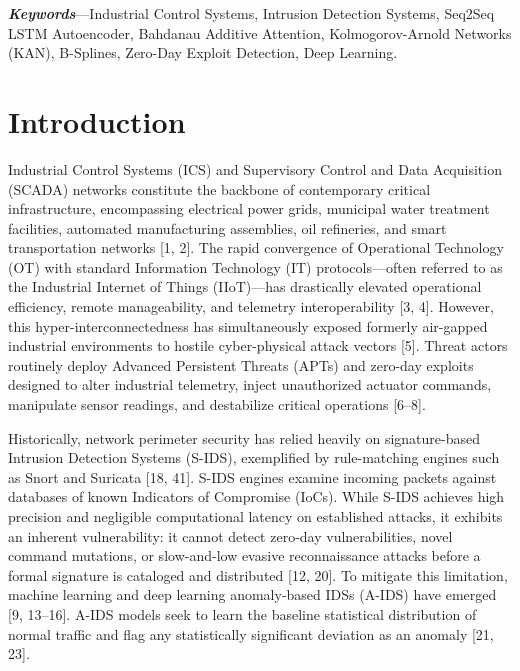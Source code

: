 \documentclass[twocolumn]{article}
\begin{document}
\textbf{\textit{Keywords}}---Industrial Control Systems, Intrusion Detection Systems, Seq2Seq LSTM Autoencoder, Bahdanau Additive Attention, Kolmogorov-Arnold Networks (KAN), B-Splines, Zero-Day Exploit Detection, Deep Learning.

\section{Introduction}
Industrial Control Systems (ICS) and Supervisory Control and Data Acquisition (SCADA) networks constitute the backbone of contemporary critical infrastructure, encompassing electrical power grids, municipal water treatment facilities, automated manufacturing assemblies, oil refineries, and smart transportation networks [1, 2]. The rapid convergence of Operational Technology (OT) with standard Information Technology (IT) protocols---often referred to as the Industrial Internet of Things (IIoT)---has drastically elevated operational efficiency, remote manageability, and telemetry interoperability [3, 4]. However, this hyper-interconnectedness has simultaneously exposed formerly air-gapped industrial environments to hostile cyber-physical attack vectors [5]. Threat actors routinely deploy Advanced Persistent Threats (APTs) and zero-day exploits designed to alter industrial telemetry, inject unauthorized actuator commands, manipulate sensor readings, and destabilize critical operations [6--8].

Historically, network perimeter security has relied heavily on signature-based Intrusion Detection Systems (S-IDS), exemplified by rule-matching engines such as Snort and Suricata [18, 41]. S-IDS engines examine incoming packets against databases of known Indicators of Compromise (IoCs). While S-IDS achieves high precision and negligible computational latency on established attacks, it exhibits an inherent vulnerability: it cannot detect zero-day vulnerabilities, novel command mutations, or slow-and-low evasive reconnaissance attacks before a formal signature is cataloged and distributed [12, 20]. To mitigate this limitation, machine learning and deep learning anomaly-based IDSs (A-IDS) have emerged [9, 13--16]. A-IDS models seek to learn the baseline statistical distribution of normal traffic and flag any statistically significant deviation as an anomaly [21, 23].
\end{document}
